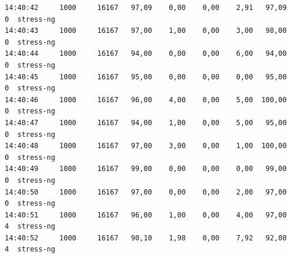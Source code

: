 \begin{verbatim}
14:40:42     1000     16167   97,09    0,00    0,00    2,91   97,09     0  stress-ng
14:40:43     1000     16167   97,00    1,00    0,00    3,00   98,00     0  stress-ng
14:40:44     1000     16167   94,00    0,00    0,00    6,00   94,00     0  stress-ng
14:40:45     1000     16167   95,00    0,00    0,00    0,00   95,00     0  stress-ng
14:40:46     1000     16167   96,00    4,00    0,00    5,00  100,00     0  stress-ng
14:40:47     1000     16167   94,00    1,00    0,00    5,00   95,00     0  stress-ng
14:40:48     1000     16167   97,00    3,00    0,00    1,00  100,00     0  stress-ng
14:40:49     1000     16167   99,00    0,00    0,00    0,00   99,00     0  stress-ng
14:40:50     1000     16167   97,00    0,00    0,00    2,00   97,00     0  stress-ng
14:40:51     1000     16167   96,00    1,00    0,00    4,00   97,00     4  stress-ng
14:40:52     1000     16167   90,10    1,98    0,00    7,92   92,08     4  stress-ng


\end{verbatim}
